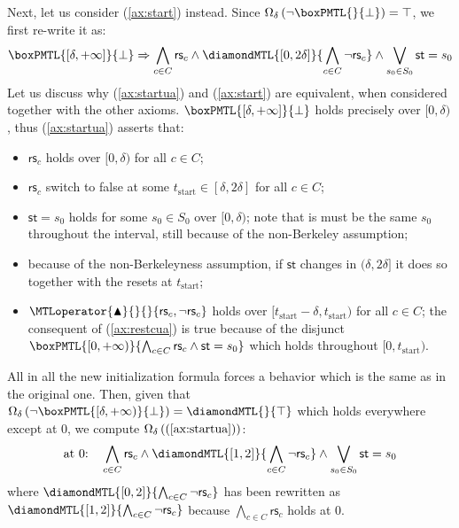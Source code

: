 \documentclass[a4paper]{article}
\newcommand{\tstart}{t_{\mathrm{start}}}
\newcommand{\frf}[1]{(\ref{#1})}
\newcommand{\underap}[1]{\Omega_{\delta}\left({#1}\right)}
\newcommand{\logictrue}{\top}
\newcommand{\logicfalse}{\bot}
\newcommand{\st}{\mathsf{st}}
\newcommand{\rest}[1]{\mathsf{rs}_{#1}}
\newcommand{\becomesOMTL}[1]{\MTLoperator{\blacktriangle}{}{}{#1}}
\newcommand{\becomesLMTL}[1]{\becomesOMTL{#1}}
\theoremstyle{plain}
\theoremstyle{definition}
\begin{document}
Next, let us consider \frf{ax:start} instead.
Since $\underap{\neg \boxPMTL{}{\logicfalse}} = \logictrue$, we first re-write it as:
\begin{equation} \label{ax:startua}
\boxPMTL{[\delta, +\infty]}{\logicfalse} \Rightarrow
\bigwedge_{c \in C} \rest{c} \wedge \diamondMTL{[0,2\delta]}{\bigwedge_{c \in C}\neg\rest{c}}
                      \wedge \bigvee_{s_0 \in S_0} \st = s_0
\end{equation}
Let us discuss why \frf{ax:startua} and \frf{ax:start} are equivalent, when considered together with the other axioms.
$\boxPMTL{[\delta, +\infty]}{\logicfalse}$ holds precisely over $[0, \delta)$, thus \frf{ax:startua} asserts that:
\begin{itemize}
  \item $\rest{c}$ holds over $[0,\delta)$ for all $c \in C$;
  \item $\rest{c}$ switch to false at some $\tstart \in [\delta, 2\delta]$ for all $c \in C$;
  \item $\st = s_0$ holds for some $s_0 \in S_0$ over $[0,\delta)$;
	 note that is must be the same $s_0$ throughout the interval, still because of the non-Berkeley assumption;
  \item because of the non-Berkeleyness assumption, if $\st$ changes in $(\delta, 2\delta]$ it does so together with the resets at $\tstart$;
  \item $\becomesLMTL{\rest{c}, \neg \rest{c}}$ holds over $[\tstart-\delta,\tstart)$ for all $c \in C$; the consequent of \frf{ax:restcua} is true because of the disjunct $\boxPMTL{[0, +\infty)}{\bigwedge_{c \in C} \rest{c} \wedge \st = s_0}$ which holds throughout $[0,\tstart)$.
\end{itemize}
All in all the new initialization formula forces a behavior which is the same as in the original one.
Then, given that $\underap{\neg \boxPMTL{[\delta, +\infty)}{\logicfalse}} = \diamondMTL{}{\logictrue}$ which holds everywhere except at $0$, we compute $\underap{\frf{ax:startua}}$:
\begin{equation} \label{ax:start-underap}
  \text{at $0$:}\quad \bigwedge_{c \in C} \rest{c} \wedge \diamondMTL{[1,2]}{\bigwedge_{c \in C}\neg\rest{c}}
                      \wedge \bigvee_{s_0 \in S_0} \st = s_0
\end{equation}
where $\diamondMTL{[0,2]}{\bigwedge_{c \in C}\neg\rest{c}}$ has been rewritten as $\diamondMTL{[1,2]}{\bigwedge_{c \in C}\neg\rest{c}}$ because $\bigwedge_{c \in C} \rest{c}$ holds at $0$.
\end{document}
